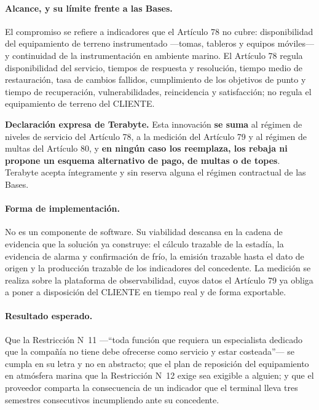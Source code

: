 \paragraph*{Alcance, y su límite frente a las Bases.}
El compromiso se refiere a indicadores que el Artículo 78\textdegree{} no
cubre: disponibilidad del equipamiento de terreno instrumentado —tomas,
tableros y equipos móviles— y continuidad de la instrumentación en ambiente
marino. El Artículo 78\textdegree{} regula disponibilidad del servicio, tiempos
de respuesta y resolución, tiempo medio de restauración, tasa de cambios
fallidos, cumplimiento de los objetivos de punto y tiempo de recuperación,
vulnerabilidades, reincidencia y satisfacción; no regula el equipamiento de
terreno del CLIENTE.

\begin{bloquePropuesta}
\textbf{Declaración expresa de Terabyte.} Esta innovación \textbf{se suma} al
régimen de niveles de servicio del Artículo 78\textdegree{}, a la medición del
Artículo 79\textdegree{} y al régimen de multas del Artículo 80\textdegree{}, y
\textbf{en ningún caso los reemplaza, los rebaja ni propone un esquema
alternativo de pago, de multas o de topes}. Terabyte acepta íntegramente y sin
reserva alguna el régimen contractual de las Bases.
\end{bloquePropuesta}

\paragraph*{Forma de implementación.}
No es un componente de software. Su viabilidad descansa en la cadena de
evidencia que la solución ya construye: el cálculo trazable de la estadía, la
evidencia de alarma y confirmación de frío, la emisión trazable hasta el dato
de origen y la producción trazable de los indicadores del concedente. La
medición se realiza sobre la plataforma de observabilidad, cuyos datos el
Artículo 79\textdegree{} ya obliga a poner a disposición del CLIENTE en tiempo
real y de forma exportable.

\paragraph*{Resultado esperado.}
Que la Restricción N\textdegree{}~11 —\enquote{toda función que requiera un
especialista dedicado que la compañía no tiene debe ofrecerse como servicio y
estar costeada}— se cumpla en su letra y no en abstracto; que el plan de
reposición del equipamiento en atmósfera marina que la Restricción
N\textdegree{}~12 exige sea exigible a alguien; y que el proveedor comparta la
consecuencia de un indicador que el terminal lleva tres semestres consecutivos
incumpliendo ante su concedente.

